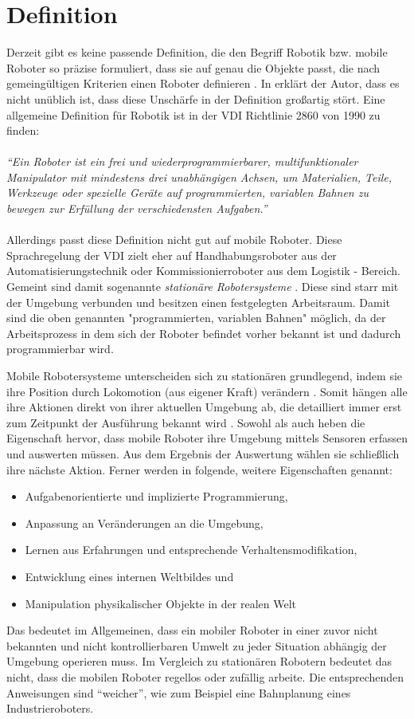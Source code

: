\section{Definition}
Derzeit gibt es keine passende Definition, die den Begriff Robotik bzw. mobile Roboter so präzise formuliert, dass sie auf genau die Objekte passt, die nach gemeingültigen Kriterien einen Roboter definieren \cite{hertzberg2009mobile}. In \cite{hertzberg2009mobile} erklärt der Autor, dass es nicht unüblich ist, dass diese Unschärfe in der Definition großartig stört. Eine allgemeine Definition für Robotik ist in der \ac{VDI} Richtlinie 2860 von 1990 zu finden:
\\
\\
\textit{"`Ein Roboter ist ein frei und wiederprogrammierbarer, multifunktionaler Manipulator mit mindestens drei unabhängigen Achsen, um Materialien, Teile, Werkzeuge oder spezielle Geräte auf programmierten,
variablen Bahnen zu bewegen zur Erfüllung der verschiedensten Aufgaben."'}
\\
\\
Allerdings passt diese Definition nicht gut auf mobile Roboter. Diese Sprachregelung der \ac{VDI} zielt eher auf Handhabungsroboter aus der Automatisierungstechnik oder Kommissionierroboter aus dem Logistik - Bereich. Gemeint sind damit sogenannte \textit{stationäre Robotersysteme} \cite{Haun2007}. Diese sind starr mit der Umgebung verbunden und besitzen einen festgelegten Arbeitsraum. Damit sind die oben genannten "programmierten, variablen Bahnen" möglich, da der Arbeitsprozess in dem sich der Roboter befindet vorher bekannt ist und dadurch programmierbar wird. 

Mobile Robotersysteme unterscheiden sich zu stationären grundlegend, indem sie ihre Position durch Lokomotion (aus eigener Kraft) verändern \cite{Haun2007}. Somit hängen alle ihre Aktionen direkt von ihrer aktuellen Umgebung ab, die detailliert immer erst zum Zeitpunkt der Ausführung bekannt wird \cite{hertzberg2009mobile}. Sowohl \cite{hertzberg2009mobile} als auch \cite{Haun2007} heben die Eigenschaft hervor, dass mobile Roboter ihre Umgebung mittels Sensoren erfassen und auswerten müssen. Aus dem Ergebnis der Auswertung wählen sie schließlich ihre nächste Aktion. Ferner werden in \cite{Haun2007} folgende, weitere Eigenschaften genannt:
\begin{itemize}
\item Aufgabenorientierte und implizierte Programmierung,
\item Anpassung an Veränderungen an die Umgebung,
\item Lernen aus Erfahrungen und entsprechende Verhaltensmodifikation,
\item Entwicklung eines internen Weltbildes und
\item Manipulation physikalischer Objekte in der realen Welt
\end{itemize}
Das bedeutet im Allgemeinen, dass ein mobiler Roboter in einer zuvor nicht bekannten und nicht kontrollierbaren Umwelt zu jeder Situation abhängig der Umgebung operieren muss. Im Vergleich zu stationären Robotern bedeutet das nicht, dass die mobilen Roboter regellos oder zufällig arbeite. Die entsprechenden Anweisungen sind "`weicher"', wie zum Beispiel eine Bahnplanung eines Industrieroboters.

